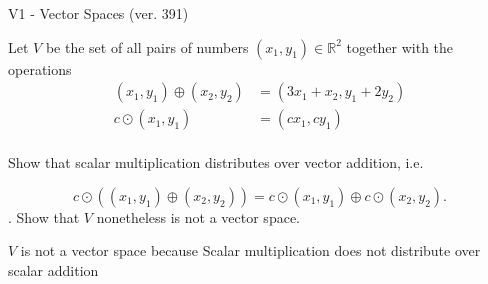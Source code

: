 \begin{exercise}
  \begin{exerciseTitle}V1 - Vector Spaces (ver. 391)\end{exerciseTitle}
  \begin{exerciseStatement}
    Let \(V\) be the set of all pairs of numbers \((x_1,y_1)\in\mathbb{R}^2\)  together with the operations 
\begin{align*}
(x_1,y_1)\oplus (x_2,y_2)&= (3x_1+x_2, y_1+2y_2)\\ 
c \odot (x_1,y_1) &= (cx_1,cy_1)\\ 
\end{align*}

	Show that scalar multiplication distributes over vector addition, i.e. 
					
\[c\odot \left((x_1,y_1)\oplus(x_2,y_2)\right)=c\odot(x_1,y_1)\oplus c\odot(x_2,y_2).\]
.
	Show that \(V\) nonetheless is not a vector space.
	


  \end{exerciseStatement}
  \begin{exerciseAnswer}
   \(V\) is not a vector space because Scalar multiplication does not distribute over scalar addition
	
  


  \end{exerciseAnswer}
\end{exercise}